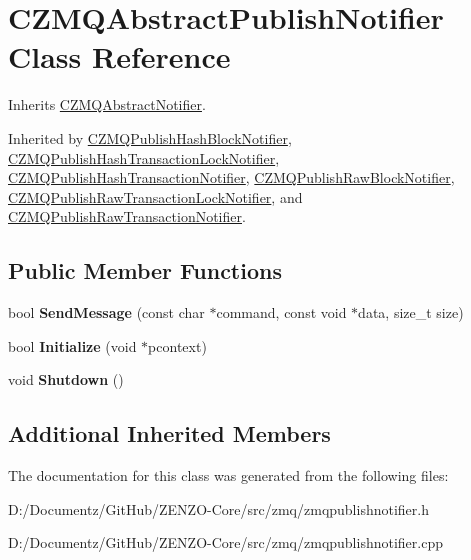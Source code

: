 \hypertarget{class_c_z_m_q_abstract_publish_notifier}{}\section{C\+Z\+M\+Q\+Abstract\+Publish\+Notifier Class Reference}
\label{class_c_z_m_q_abstract_publish_notifier}


Inherits \mbox{\hyperlink{class_c_z_m_q_abstract_notifier}{C\+Z\+M\+Q\+Abstract\+Notifier}}.



Inherited by \mbox{\hyperlink{class_c_z_m_q_publish_hash_block_notifier}{C\+Z\+M\+Q\+Publish\+Hash\+Block\+Notifier}}, \mbox{\hyperlink{class_c_z_m_q_publish_hash_transaction_lock_notifier}{C\+Z\+M\+Q\+Publish\+Hash\+Transaction\+Lock\+Notifier}}, \mbox{\hyperlink{class_c_z_m_q_publish_hash_transaction_notifier}{C\+Z\+M\+Q\+Publish\+Hash\+Transaction\+Notifier}}, \mbox{\hyperlink{class_c_z_m_q_publish_raw_block_notifier}{C\+Z\+M\+Q\+Publish\+Raw\+Block\+Notifier}}, \mbox{\hyperlink{class_c_z_m_q_publish_raw_transaction_lock_notifier}{C\+Z\+M\+Q\+Publish\+Raw\+Transaction\+Lock\+Notifier}}, and \mbox{\hyperlink{class_c_z_m_q_publish_raw_transaction_notifier}{C\+Z\+M\+Q\+Publish\+Raw\+Transaction\+Notifier}}.

\subsection*{Public Member Functions}
\begin{DoxyCompactItemize}
\item 
\mbox{\label{class_c_z_m_q_abstract_publish_notifier_a1bec52cf2e0ef829bbd067cac11acfdd}} 
bool {\bfseries Send\+Message} (const char $\ast$command, const void $\ast$data, size\+\_\+t size)
\item 
\mbox{\label{class_c_z_m_q_abstract_publish_notifier_a73331e53a4ad4efb0ae26348c24ff8fa}} 
bool {\bfseries Initialize} (void $\ast$pcontext)
\item 
\mbox{\label{class_c_z_m_q_abstract_publish_notifier_a9f11ac193ff2a4a703817ba3e6c00836}} 
void {\bfseries Shutdown} ()
\end{DoxyCompactItemize}
\subsection*{Additional Inherited Members}


The documentation for this class was generated from the following files\+:\begin{DoxyCompactItemize}
\item 
D\+:/\+Documentz/\+Git\+Hub/\+Z\+E\+N\+Z\+O-\/\+Core/src/zmq/zmqpublishnotifier.\+h\item 
D\+:/\+Documentz/\+Git\+Hub/\+Z\+E\+N\+Z\+O-\/\+Core/src/zmq/zmqpublishnotifier.\+cpp\end{DoxyCompactItemize}

